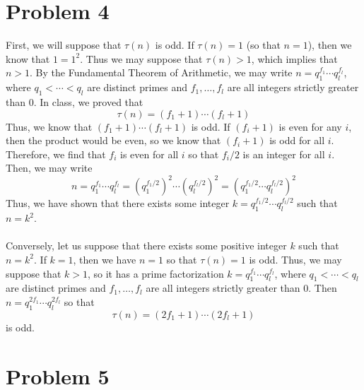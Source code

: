 \documentclass[12pt]{article}
\begin{document}
\section*{Problem 4}
First, we will suppose that $\tau(n)$ is odd. If $\tau(n) = 1$ (so that $n  = 1$), then we know that $1 = 1^2$. Thus we may suppose that $\tau(n) > 1$, which implies that $n > 1$. By the Fundamental Theorem of Arithmetic, we may write $n = q_1^{f_1} \cdots q_l^{f_l}$, where $q_1 < \cdots < q_l$ are distinct primes and $f_1,\ldots, f_l$ are all integers strictly greater than $0$. In class, we proved that
\[
\tau(n) = (f_1+1)\cdots(f_l+1)
\] Thus, we know that $(f_1+1)\cdots (f_l+1)$ is odd. If $(f_i+1)$ is even for any $i$, then the product would be even, so we know that $(f_i+1)$ is odd for all $i$. Therefore, we find that $f_i$ is even for all $i$ so that $f_i/2$ is an integer for all $i$. Then, we may write
\[
n = q_1^{f_1} \cdots q_l^{f_l} = (q_1^{f_1/2})^2 \cdots (q_l^{f_l/2})^2 = (q_1^{f_1/2}\cdots q_l^{f_l/2})^2
\] Thus, we have shown that there exists some integer $k = q_1^{f_1/2}\cdots q_l^{f_l/2}$ such that $n = k^2$.
\\ \\
Conversely, let us suppose that there exists some positive integer $k$ such that $n = k^2$. If $k = 1$, then we have $n = 1$ so that $\tau(n) = 1$ is odd. Thus, we may suppose that $k > 1$, so it has a prime factorization $k = q_1^{f_1} \cdots q_l^{f_l}$, where $q_1 < \cdots < q_l$ are distinct primes and $f_1,\ldots,f_l$ are all integers strictly greater than $0$. Then $n = q_1^{2f_1}\cdots q_l^{2f_l}$ so that
\[
\tau(n) = (2f_1 + 1)\cdots (2f_l + 1)
\] is odd.
\newpage
\section*{Problem 5}
\end{document}
